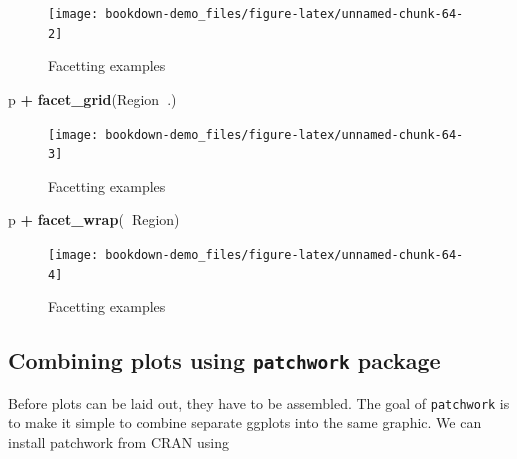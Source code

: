\documentclass[]{book}
\newenvironment{Shaded}{\begin{snugshade}}{\end{snugshade}}
\newcommand{\KeywordTok}[1]{\textcolor[rgb]{0.13,0.29,0.53}{\textbf{#1}}}
\newcommand{\StringTok}[1]{\textcolor[rgb]{0.31,0.60,0.02}{#1}}
\newcommand{\OperatorTok}[1]{\textcolor[rgb]{0.81,0.36,0.00}{\textbf{#1}}}
\newcommand{\NormalTok}[1]{#1}
\begin{document}
\begin{figure}

{\centering \texttt{[image: bookdown-demo\_files/figure-latex/unnamed-chunk-64-2]} 

}

\caption{Facetting examples}\label{fig:unnamed-chunk-64-2}
\end{figure}

\begin{Shaded}
\begin{Highlighting}[]
\NormalTok{p }\OperatorTok{+}\StringTok{ }\KeywordTok{facet_grid}\NormalTok{(Region}\OperatorTok{~}\NormalTok{.)}
\end{Highlighting}
\end{Shaded}

\begin{figure}

{\centering \texttt{[image: bookdown-demo\_files/figure-latex/unnamed-chunk-64-3]} 

}

\caption{Facetting examples}\label{fig:unnamed-chunk-64-3}
\end{figure}

\begin{Shaded}
\begin{Highlighting}[]
\NormalTok{p }\OperatorTok{+}\StringTok{ }\KeywordTok{facet_wrap}\NormalTok{(}\OperatorTok{~}\NormalTok{Region)}
\end{Highlighting}
\end{Shaded}

\begin{figure}

{\centering \texttt{[image: bookdown-demo\_files/figure-latex/unnamed-chunk-64-4]} 

}

\caption{Facetting examples}\label{fig:unnamed-chunk-64-4}
\end{figure}

\subsection{\texorpdfstring{Combining plots using \texttt{patchwork}
package}{Combining plots using patchwork package}}\label{combining-plots-using-patchwork-package}

Before plots can be laid out, they have to be assembled. The goal of
\texttt{patchwork} is to make it simple to combine separate ggplots into
the same graphic. We can install patchwork from CRAN using
\end{document}
